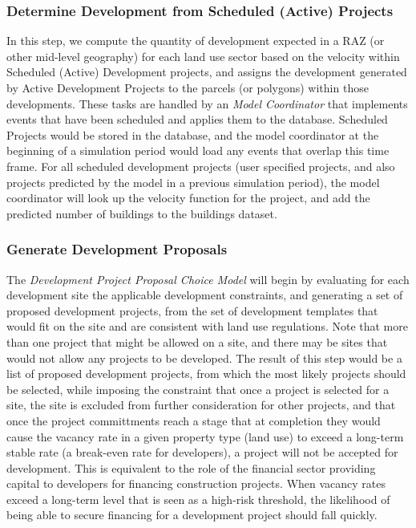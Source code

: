 \subsubsection{Determine Development from Scheduled (Active) Projects}

In this step, we compute the quantity of development expected in a RAZ (or other mid-level geography) for each land use
sector based on the velocity within Scheduled (Active) Development projects, and assigns the development generated
by Active Development Projects to the parcels (or polygons) within those developments.  These tasks are
handled by an \emph{Model Coordinator} that implements events that have been scheduled and applies
them to the database.  Scheduled Projects would be stored in the database, and the model coordinator
at the beginning of a simulation period would load any events that overlap this time frame.  For all scheduled
development projects (user specified projects, and also projects predicted by the model in a previous simulation
period), the model coordinator will look up the velocity function for the project, and add the predicted number
of buildings to the buildings dataset. 

\subsubsection{Generate Development Proposals}

The \emph{Development Project Proposal Choice Model} will begin by evaluating for each development site 
the applicable development constraints, and
generating a set of proposed development projects, from the set of development templates
that would fit on the site and are consistent with land use regulations.  
Note that more than one project that might be allowed on a site, and
there may be sites that would not allow any projects to be developed.  The result of this step
would be a list of proposed development projects, from which the most likely projects should be
selected, while imposing the constraint that once a project is selected for a site, the site is
excluded from further consideration for other projects, and that once the project committments
reach a stage that at completion they would cause the vacancy rate in a given property type (land
use) to exceed a long-term stable rate (a break-even rate for developers), a project will not be
accepted for development.  This is equivalent to the role of the financial sector providing
capital to developers for financing construction projects. When vacancy rates exceed a long-term
level that is seen as a high-risk threshold, the likelihood of being able to secure financing for
a development project should fall quickly.

